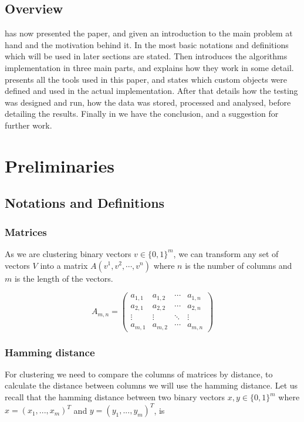 \documentclass[a4paper]{article}
\begin{document}
\subsection{Overview}
 has now presented the paper, and given an introduction to the main problem at hand and the
motivation behind it. In  the most basic notations and definitions which will be used in
later sections are stated. Then  introduces the algorithms implementation in three main parts, and
explains how they work in some detail.  presents all the tools used in this paper, and states which
custom objects were defined and used in the actual implementation. After that  details how the
testing was designed and run, how the data was stored, processed and analysed, before detailing the results. Finally
in  we have the conclusion, and a suggestion for further work.

%
%

\newpage

\section{Preliminaries}
\label{sec:prelim}
\subsection{Notations and Definitions}
\subsubsection{Matrices}
As we are clustering binary vectors $v \in \{0,1\}^m$, we can transform any set of vectors
$V$ into a matrix $A(v^1, v^2, \cdots, v^n)$ where $n$ is the number of columns
and $m$ is the length of the vectors.

\[
    A_{m,n} =
    \begin{pmatrix}
        a_{1,1} & a_{1,2} & \cdots & a_{1,n} \\
        a_{2,1} & a_{2,2} & \cdots & a_{2,n} \\
        \vdots  & \vdots  & \ddots & \vdots  \\
        a_{m,1} & a_{m,2} & \cdots & a_{m,n}
    \end{pmatrix}
\]

\subsubsection{Hamming distance}
For clustering we need to compare the columns of matrices by distance, to calculate the distance
between columns we will use the hamming distance. Let us recall that the hamming distance
between two binary vectors $x,y \in \{0,1\}^m$ where $x=(x_1,...,x_m)^T$ and
$y=(y_1,...,y_m)^T$, is
\end{document}
